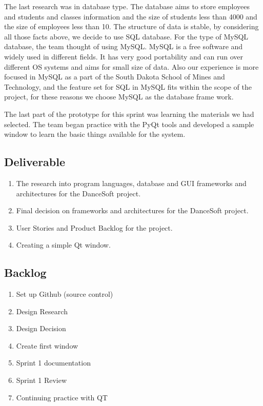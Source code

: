 The last research was in database type. The database aims to store employees and students and classes information and the size of students less than 4000 and the size of employees less than 10. The structure of data is stable, by considering all those facts above, we decide to use SQL database. For the type of MySQL database, the team thought of using MySQL. MySQL is a free software and widely used in different fields. It has very good portability and can run over different OS systems and aims for small size of data. Also our experience is more focused in MySQL as a part of the South Dakota School of Mines and Technology, and the feature set for SQL in MySQL fits within the scope of the project, for these reasons we choose MySQL as the database frame work.


The last part of the prototype for this sprint was learning the materials we had selected. The team began practice with the PyQt tools and developed a sample window to learn the basic things available for the system.\\

\subsection{Deliverable}
\begin{enumerate}
\item The research into program languages, database and GUI frameworks and architectures for the DanceSoft project.
\item Final decision on frameworks and architectures for the DanceSoft project.
\item User Stories and Product Backlog for the project.
\item Creating a simple Qt window.
\end{enumerate}

\subsection{Backlog}
\begin{enumerate}
\item Set up Github (source control)
\item Design Research
\item Design Decision
\item Create first window
\item Sprint 1 documentation
\item Sprint 1 Review
\item Continuing practice with QT

\end{enumerate}

